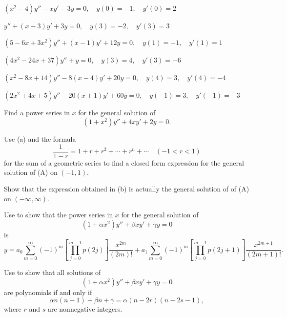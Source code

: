 \begin{exerciselist}
\item\label{exer:7.2.21}\Cex $(x^2-4)y''-xy'-3y=0,\quad y(0)=-1,\quad
y'(0)=2$
\item\label{exer:7.2.22}\Cex $y''+(x-3)y'+3y=0,\quad y(3)=-2,\quad
y'(3)=3$
\item\label{exer:7.2.23}\Cex $(5-6x+3x^2)y''+(x-1)y'+12y=0,\quad
y(1)=-1,\quad y'(1)=1$
\item\label{exer:7.2.24}\Cex $(4x^2-24x+37)y''+y=0,\quad y(3)=4,\quad
y'(3)=-6$
\item\label{exer:7.2.25}\Cex $(x^2-8x+14)y''-8(x-4)y'+20y=0,\quad
y(4)=3,\quad y'(4)=-4$
\item\label{exer:7.2.26}\Cex
$(2x^2+4x+5)y''-20(x+1)y'+60y=0,\quad y(-1)=3,\quad y'(-1)=-3$

\item\label{exer:7.2.27}\begin{alist}
\item %
Find a power series in $x$ for the general solution of
\[
(1+x^2)y''+4xy'+2y=0.
\tag{A}
\]
\item %
Use (a) and the formula
\[
\frac{1}{1-r}=1+r+r^2+\cdots+r^n+\cdots \quad(-1<r<1)
\]
for the sum of a geometric series to find a closed form expression for
the general solution of (A) on $(-1,1)$.
\item %
Show that the expression obtained in (b) is actually the general
solution of of (A) on $(-\infty,\infty)$.
\end{alist}

\item\label{exer:7.2.28}Use  to show that the power series in
$x$ for the general solution of
\[
(1+\alpha x^2)y''+\beta xy'+\gamma y=0
\]
is
\[
y=a_0\sum^\infty_{m=0}(-1)^m \left[\prod^{m-1}_{j=0}
p(2j)\right]\frac{x^{2m}}{(2m)!} +
a_1\sum^\infty_{m=0}(-1)^m
\left[\prod^{m-1}_{j=0}p(2j+1)\right]
\frac{x^{2m+1}}{(2m+1)!}.
\]

\item\label{exer:7.2.29}Use   to
 show that  all  solutions of
\[
(1+\alpha x^2)y''+\beta xy'+\gamma y=0
\]
 are polynomials if and only if
\[
\alpha n(n-1)+\beta n+\gamma=\alpha(n-2r)(n-2s-1),
\]
where $r$ and $s$ are nonnegative integers.


\end{exerciselist}
